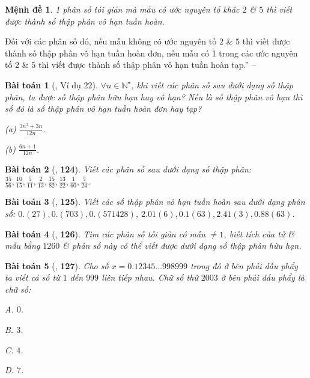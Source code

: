 \documentclass{article}
\numberwithin{equation}{section}
\newtheorem{baitoan}{Bài toán}[section]
\newtheorem{menhde}{Mệnh đề}[section]
\begin{document}
\begin{menhde}
	1 phân số tói giản mà mẫu có ước nguyên tố khác $2$ \& $5$ thì viết được thành số thập phân vô hạn tuần hoàn.
\end{menhde}
Đối với các phân số đó, nếu mẫu không có ước nguyên tố $2$ \& $5$ thì viết được thành số thập phân vô hạn tuần hoàn đơn, nếu mẫu có 1 trong các ước nguyên tố $2$ \& $5$ thì viết được thành số thập phân vô hạn tuần hoàn tạp.'' -- \cite{Binh_Toan_7_tap_1}

\begin{baitoan}[\cite{Binh_Toan_7_tap_1}, Ví dụ 22]
	$\forall n\in\mathbb{N}^\star$, khi viết các phân số sau dưới dạng số thập phân, ta được số thập phân hữu hạn hay vô hạn? Nếu là số thập phân vô hạn thì số đó là số thập phân vô hạn tuần hoàn đơn hay tạp?
	\begin{enumerate*}
		\item[(a)] $\frac{3n^2 + 3n}{12n}$.
		\item[(b)] $\frac{6n + 1}{12n}$.
	\end{enumerate*}
\end{baitoan}

\begin{baitoan}[\cite{Binh_Toan_7_tap_1}, \textbf{124}]
	Viết các phân số sau dưới dạng số thập phân: $\frac{35}{56},\frac{10}{15},\frac{5}{11},\frac{2}{13},\frac{15}{82},\frac{13}{22},\frac{1}{60},\frac{5}{24}$.
\end{baitoan}

\begin{baitoan}[\cite{Binh_Toan_7_tap_1}, \textbf{125}]
	Viết các số thập phân vô hạn tuần hoàn sau dưới dạng phân số: $0.(27),0.(703),0.(571428)$, $2.01(6),0.1(63),2.41(3),0.88(63)$.
\end{baitoan}

\begin{baitoan}[\cite{Binh_Toan_7_tap_1}, \textbf{126}]
	Tìm các phân số tối giản có mẫu $\ne 1$, biết tích của tử \& mẫu bằng $1260$ \& phân số này có thể viết được dưới dạng số thập phân hữu hạn.
\end{baitoan}

\begin{baitoan}[\cite{Binh_Toan_7_tap_1}, \textbf{127}]
	Cho số $x = 0.12345\ldots 998999$ trong đó ở bên phải dấu phẩy ta viết cá số từ $1$ đến $999$ liên tiếp nhau. Chữ số thứ $2003$ ở bên phải dấu phẩy là chữ số:
	\begin{enumerate*}
		\item[{\rm\sf A.}] $0$.
		\item[{\rm\sf B.}] $3$.
		\item[{\rm\sf C.}] $4$.
		\item[{\rm\sf D.}] $7$.
	\end{enumerate*}
\end{baitoan}
\end{document}
